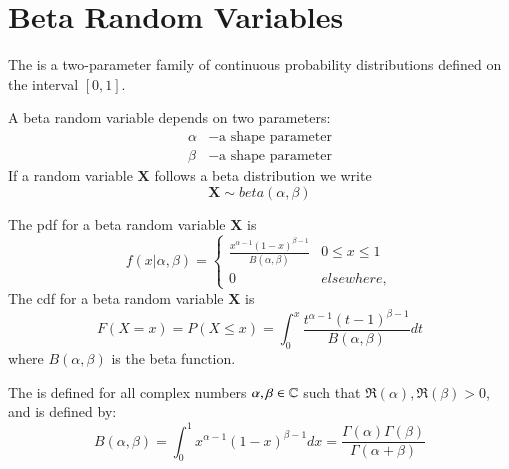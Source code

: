 \documentclass[12pt]{report}
\begin{document}
\section{Beta Random Variables}

\begin{defn}{}{}
    The  is a two-parameter family of continuous probability distributions defined on the interval $[0,1]$. 
\end{defn}

\begin{defn}{}{}
    A beta random variable depends on two parameters: \begin{align*}
        \alpha &- \text{a shape parameter} \\
        \beta &- \text{a shape parameter}
    \end{align*}
    If a random variable $\mathbf{X}$ follows a beta distribution we write $$\mathbf{X}\sim beta(\alpha,\beta)$$
\end{defn}

\begin{defn}{}{}
    The pdf for a beta random variable $\mathbf{X}$ is \begin{equation*}
        f(x\vert\alpha,\beta) = \left\{\begin{array}{cc} \frac{x^{\alpha-1}(1-x)^{\beta-1}}{B(\alpha,\beta)} & 0 \leq x \leq 1 \\ 0 & elsewhere, \end{array}\right.
    \end{equation*}
    The cdf for a beta random variable $\mathbf{X}$ is \begin{equation*}
        F(X = x) = P(X\leq x) = \int_{0}^x\frac{t^{\alpha-1}(t-1)^{\beta-1}}{B(\alpha,\beta)}dt
    \end{equation*}
    where $B(\alpha,\beta)$ is the beta function.
\end{defn}

\begin{defn}{}{}
    The  is defined for all complex numbers $\alpha,\beta \in \mathbb C$ such that $\mathfrak{R}(\alpha),\mathfrak{R}(\beta) > 0$, and is defined by: \begin{equation*}
        B(\alpha,\beta) = \int_0^1x^{\alpha-1}(1-x)^{\beta-1}dx = \frac{\Gamma(\alpha)\Gamma(\beta)}{\Gamma(\alpha+\beta)}
    \end{equation*}
\end{defn}
\end{document}
